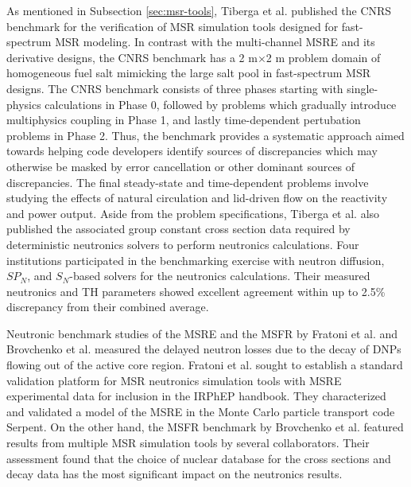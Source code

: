 As mentioned in Subsection \ref{sec:msr-tools}, Tiberga et al. \cite{tiberga_results_2020}
published the CNRS benchmark for the verification of \gls{MSR} simulation tools designed for
fast-spectrum \gls{MSR} modeling. In contrast with the multi-channel \gls{MSRE} and its derivative
designs, the CNRS benchmark has a 2 m$\times$2 m problem domain of homogeneous fuel salt mimicking
the large salt pool in fast-spectrum \gls{MSR} designs. The CNRS benchmark consists of three phases
starting with single-physics calculations in Phase 0, followed by problems which gradually
introduce multiphysics coupling in Phase 1, and lastly time-dependent pertubation problems in Phase
2. Thus, the benchmark provides a systematic approach aimed towards helping code developers
identify sources of discrepancies which may otherwise be masked by error cancellation or other
dominant sources of discrepancies. The final steady-state and time-dependent problems involve
studying the effects of natural circulation and lid-driven flow on the reactivity and power output.
Aside from the problem specifications, Tiberga et al. also published the associated group
constant cross section data required by deterministic neutronics solvers to perform neutronics
calculations. Four institutions participated in the benchmarking exercise with neutron diffusion,
$SP_N$, and $S_N$-based solvers for the neutronics calculations. Their measured neutronics and
\gls{TH} parameters showed excellent agreement within up to 2.5\% discrepancy from their combined
average.

Neutronic benchmark studies of the \gls{MSRE} and the \gls{MSFR} by Fratoni et al.
\cite{fratoni_molten_2020} and Brovchenko et al. \cite{brovchenko_neutronic_2019} measured the
delayed neutron losses due to the decay of \glspl{DNP} flowing out of the active core region.
Fratoni et al. sought to establish a standard validation platform for \gls{MSR} neutronics
simulation tools with \gls{MSRE} experimental data for inclusion in the \gls{IRPhEP} handbook.
They characterized and validated a model of the \gls{MSRE} in the Monte Carlo particle transport
code Serpent. On the other hand, the \gls{MSFR} benchmark by Brovchenko et al. featured results
from multiple \gls{MSR} simulation tools by several collaborators. Their assessment found that
the choice of nuclear database for the cross sections and decay data has the most significant
impact on the neutronics results.


